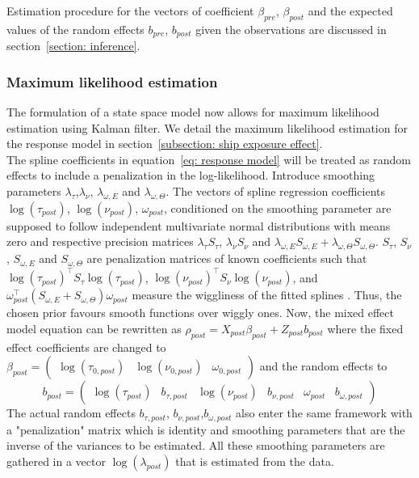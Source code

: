 \documentclass[11pt]{article}
\newcommand {\1}{\mathbb{1}}
\begin{document}
Estimation procedure for the vectors of coefficient $\beta_{pre}$, $\beta_{post}$ and the expected values of the random effects $b_{pre}$, $b_{post}$ given the observations are discussed in section~\ref{section: inference}.\\







\subsubsection{Maximum likelihood estimation}
The formulation of a state space model now allows for maximum likelihood estimation using Kalman filter.
We detail the maximum likelihood estimation for the response model in section~\ref{subsection: ship exposure effect}. \\

The spline coefficients in equation~\ref{eq: response model} will be treated as random effects to include a penalization in the log-likelihood. 
Introduce smoothing parameters $\lambda_{\tau}$,$\lambda_{\nu}$, $\lambda_{\omega,E}$ and $\lambda_{\omega,\Theta}$. The vectors of spline regression coefficients $\log(\tau_{post})$, $\log(\nu_{post})$, $\omega_{post}$,  conditioned on the smoothing parameter are supposed to follow independent multivariate normal distributions with means zero and respective precision matrices $\lambda_{\tau}S_{\tau}$, $\lambda_{\nu}S_{\nu}$ and $\lambda_{\omega,E}S_{\omega,E}+\lambda_{\omega,\Theta}S_{\omega,\Theta}$. $S_{\tau}$, $S_{\nu}$, $S_{\omega,E}$ and $S_{\omega,\Theta}$ are penalization matrices of known coefficients such that 
$\log(\tau_{post})^\top S_{\tau}\log(\tau_{post})$, $\log(\nu_{post})^\top S_{\nu}\log(\nu_{post})$, and $\omega_{post}^\top (S_{\omega,E}+S_{\omega,\Theta})\omega_{post}$ measure the wiggliness of the fitted splines \cite{michelot_varying-coefficient_2021,wood_generalized_2017}. Thus, the chosen prior favours smooth functions over wiggly ones. Now, the mixed effect model equation can be rewritten as $\rho_{post}=X_{post}\beta_{post}+Z_{post} b_{post}$ where the fixed effect coefficients are changed to $\beta_{post}=\begin{pmatrix} \log(\tau_{0,post}) & \log(\nu_{0,post}) & \omega_{0,post} \end{pmatrix} $ and the random effects to 
\[b_{post}=\begin{pmatrix} \log(\tau_{post}) & b_{\tau,post} & \log(\nu_{post}) & b_{\nu,post} & \omega_{post} & b_{\omega,post}\end{pmatrix}\]
The actual random effects $b_{\tau,post}$, $b_{\nu,post}$,$b_{\omega,post}$ also enter the same framework with a "penalization" matrix which is identity and smoothing parameters that are the inverse of the variances to be estimated.
All these smoothing parameters are gathered in a vector $\log(\lambda_{post})$ that is estimated from the data.
\\
\end{document}
